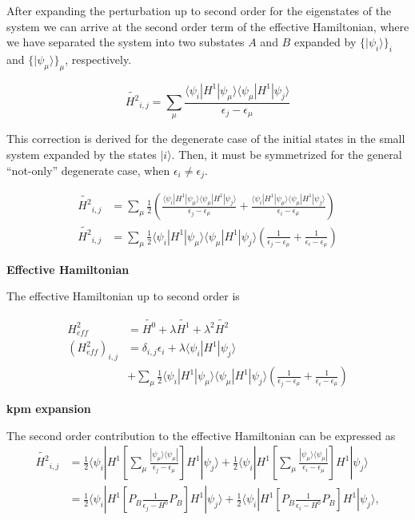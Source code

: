\documentclass[10pt, onecolumn, aps, prb, superscriptaddress, floatfix, showpacs, notitlepage]{revtex4-1}
\newcommand{\bra}[1]{\langle #1|}
\newcommand{\ket}[1]{|#1\rangle}
\begin{document}
After expanding the perturbation up to second order for the eigenstates of the system
we can arrive at the second order term of the effective Hamiltonian, where we have
separated the system into two substates $A$ and $B$ expanded by $\{\ket{\psi_i}\}_i$ and
$\{\ket{\psi_\mu}\}_\mu$, respectively.

$$
\tilde{H^2}_{i,j} = \sum_\mu\frac{
\bra{\psi_i} H^1 \ket{\psi_\mu}
\bra{\psi_\mu} H^1 \ket{\psi_j}
}
{\epsilon_j-\epsilon_\mu
}
$$

This correction is derived for the degenerate case of the initial states
in the small system expanded by the states $\ket{i}$.
Then, it must be symmetrized for the general
``not-only'' degenerate case, when $\epsilon_i\ne \epsilon_j$.

\begin{align}
\tilde{H^2}_{i,j} &= \sum_\mu\frac{1}{2}
\left(
\frac{
\bra{\psi_i} H^1 \ket{\psi_\mu}
\bra{\psi_\mu} H^1 \ket{\psi_j}}{\epsilon_j-\epsilon_\mu}
+
\frac{
\bra{\psi_i} H^1 \ket{\psi_\mu}
\bra{\psi_\mu} H^1 \ket{\psi_j}}{\epsilon_i-\epsilon_\mu}
\right)
\\
\tilde{H^2}_{i,j} &= \sum_\mu\frac{1}{2}
\bra{\psi_i} H^1 \ket{\psi_\mu}
\bra{\psi_\mu} H^1 \ket{\psi_j}
\left(\frac{1}{\epsilon_j-\epsilon_\mu}
+\frac{1}{\epsilon_i-\epsilon_\mu}
\right)
\end{align}


\textbf{Effective Hamiltonian}

The effective Hamiltonian up to second order is

\begin{align}
H_{eff}^2 &= \tilde{H^0} + \lambda \tilde{H^1} + \lambda^2\tilde{H^2}\\
(H_{eff}^2)_{i,j} &= \delta_{i,j}\epsilon_i +
\lambda \bra{\psi_i} H^1 \ket{\psi_j} \\
&+ 
\sum_\mu\frac{1}{2}
\bra{\psi_i} H^1 \ket{\psi_\mu}
\bra{\psi_\mu} H^1 \ket{\psi_j}
\left(\frac{1}{\epsilon_j-\epsilon_\mu}
+\frac{1}{\epsilon_i-\epsilon_\mu}
\right)
\end{align}

\textbf{kpm expansion}

The second order contribution to the effective Hamiltonian can be expressed as
\begin{align}
\tilde{H^2}_{i,j} &= \frac{1}{2}
\bra{\psi_i} H^1
\left[
\sum_\mu
\frac{\ket{\psi_\mu} \bra{\psi_\mu}}{\epsilon_j-\epsilon_\mu}
\right]
H^1 \ket{\psi_j}
+
\frac{1}{2}
\bra{\psi_i} H^1
\left[
\sum_\mu
\frac{\ket{\psi_\mu} \bra{\psi_\mu}}{\epsilon_i-\epsilon_\mu}
\right]
H^1 \ket{\psi_j}
\\
&= \frac{1}{2}
\bra{\psi_i} H^1
\left[P_B
\frac{1}{\epsilon_j-H^0}
P_B\right]
H^1 \ket{\psi_j}
+
\frac{1}{2}
\bra{\psi_i} H^1
\left[P_B
\frac{1}{\epsilon_i-H^0}
P_B\right]
H^1 \ket{\psi_j},
\end{align}
\end{document}
